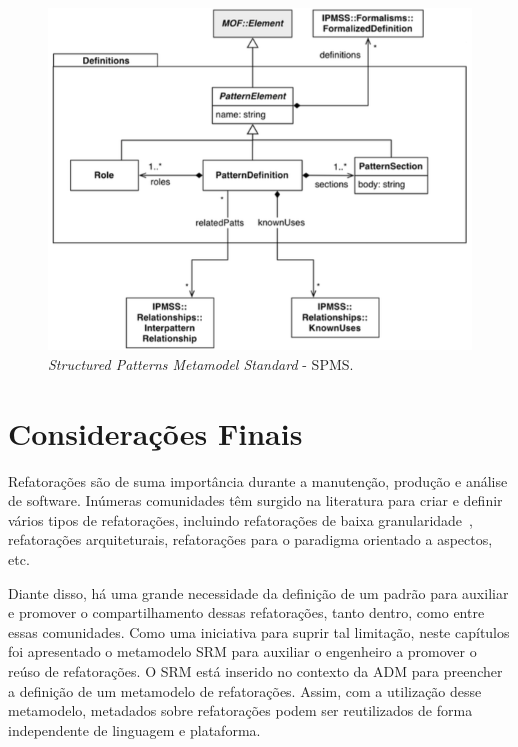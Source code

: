 \begin{figure}[h]
	\centering
	\caption{\textit{Structured Patterns Metamodel Standard} - SPMS.}
	\label{fig:SPMS_metamodel_related}
	\includegraphics[scale=0.57]{images/SPMS_related}
\end{figure}



\section{Considerações Finais}
\label{sec:consideracoes_finais_SRM}

Refatorações são de suma importância durante a manutenção, produção e análise de software. Inúmeras comunidades têm surgido na literatura para criar e definir vários tipos de refatorações, incluindo refatorações de baixa granularidade~\cite{Fowler1999, Demeyer1, Demeyer2}, refatorações arquiteturais, refatorações para o paradigma orientado a aspectos, etc. 

Diante disso, há uma grande necessidade da definição de um padrão para auxiliar e promover o compartilhamento dessas refatorações, tanto dentro, como entre essas comunidades. Como uma iniciativa para suprir tal limitação, neste capítulos foi apresentado o metamodelo SRM para auxiliar o engenheiro a promover o reúso de refatorações. O SRM está inserido no contexto da ADM para preencher a definição de um metamodelo de refatorações. Assim, com a utilização desse metamodelo, metadados sobre refatorações podem ser reutilizados de forma independente de linguagem e plataforma.

